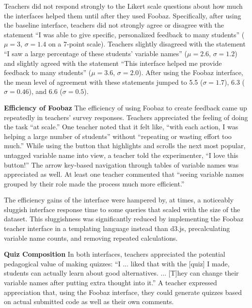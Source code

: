 Teachers did not respond strongly to the Likert scale questions about how much the interfaces helped them until after they used Foobaz. Specifically, after using the baseline interface, teachers did not strongly agree or disagree with the statement ``I was able to give specific, personalized feedback to many students'' ($\mu=3$, $\sigma = 1.4$ on a 7-point scale). Teachers slightly disagreed with the statement ``I saw a large percentage of these students' variable names'' ($\mu=2.6$, $\sigma=1.2$) and slightly agreed with the statement ``This interface helped me provide feedback to many students'' ($\mu=3.6$, $\sigma=2.0$). After using the Foobaz interface, the mean level of agreement with these statements jumped to 5.5 ($\sigma=1.7$), 6.3 ($\sigma=0.46$), and 6.6 ($\sigma=0.5$).
 
\textbf{Efficiency of Foobaz} The efficiency of using Foobaz to create feedback came up repeatedly in teachers' survey responses. Teachers appreciated the feeling of doing the task ``at scale.'' One teacher noted that it felt like, ``with each action, I was helping a large number of students'' without ``repeating or wasting effort too much.'' While using the button that highlights and scrolls the next most popular, untagged variable name into view, a teacher told the experimenter, ``I love this button!'' The arrow key-based navigation through tables of variable names was appreciated as well. At least one teacher commented that ``seeing variable names grouped by their role made the process much more efficient.'' 

The efficiency gains of the interface were hampered by, at times, a noticeably sluggish interface response time to some queries that scaled with the size of the dataset. This sluggishness was significantly reduced by implementing the Foobaz teacher interface in a templating language instead than d3.js, precalculating variable name counts, and removing repeated calculations.%

\textbf{Quiz Composition} In both interfaces, teachers appreciated the potential pedagogical value of making quizzes: ``I ... liked that with the [quiz] I made, students can actually learn about good alternatives. ... [T]hey can change their variable names after putting extra thought into it.'' A teacher expressed appreciation that, using the Foobaz interface, they could generate quizzes based on actual submitted code as well as their own comments. 

